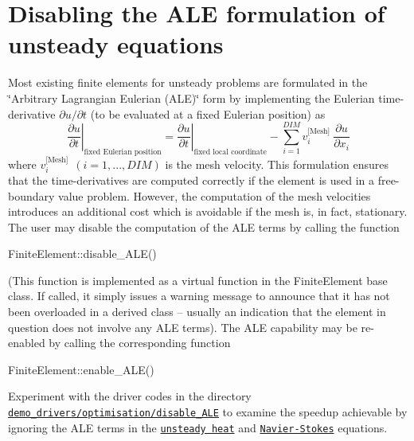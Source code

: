  

\hypertarget{index_ale}{}\section{Disabling the A\-L\-E formulation of unsteady equations}\label{index_ale}
Most existing finite elements for unsteady problems are formulated in the \char`\"{}\-Arbitrary Lagrangian Eulerian (\-A\-L\-E)\char`\"{} form by implementing the Eulerian time-\/derivative $ \partial u /\partial t$ (to be evaluated at a fixed Eulerian position) as \[ \left. \frac{\partial u}{\partial t} \right|_{\mbox{fixed Eulerian position}} = \left. \frac{\partial u}{\partial t} \right|_{\mbox{fixed local coordinate}} - \sum_{i=1}^{DIM} v_i^{\mbox{[Mesh]}} \ \frac{\partial u}{\partial x_i} \] where $ v_i^{\mbox{[Mesh]}} \ \ (i=1,...,DIM)$ is the mesh velocity. This formulation ensures that the time-\/derivatives are computed correctly if the element is used in a free-\/boundary value problem. However, the computation of the mesh velocities introduces an additional cost which is avoidable if the mesh is, in fact, stationary. The user may disable the computation of the A\-L\-E terms by calling the function 
\begin{DoxyCode}
FiniteElement::disable\_ALE()
\end{DoxyCode}
 (This function is implemented as a virtual function in the {\ttfamily Finite\-Element} base class. If called, it simply issues a warning message to announce that it has not been overloaded in a derived class -- usually an indication that the element in question does not involve any A\-L\-E terms). The A\-L\-E capability may be re-\/enabled by calling the corresponding function 
\begin{DoxyCode}
FiniteElement::enable\_ALE()
\end{DoxyCode}


Experiment with the driver codes in the directory \href{../../../demo_drivers/optimisation/disable_ALE}{\tt demo\-\_\-drivers/optimisation/disable\-\_\-\-A\-L\-E} to examine the speedup achievable by ignoring the A\-L\-E terms in the \href{../../../demo_drivers/optimisation/disable_ALE/unsteady_heat}{\tt unsteady heat} and \href{../../../demo_drivers/optimisation/disable_ALE/navier_stokes}{\tt Navier-\/\-Stokes} equations.



 


